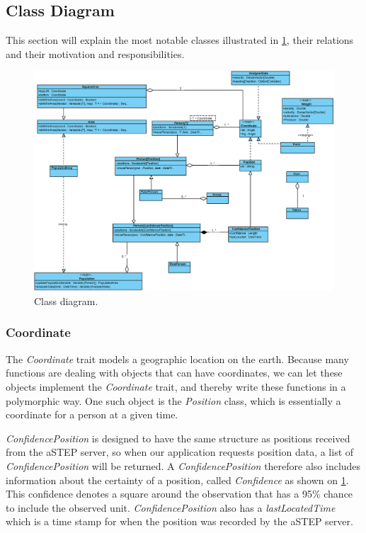 \subsection{Class Diagram}
This section will explain the most notable classes illustrated in \cref{fig:class}, their relations and their motivation and responsibilities.

\begin{figure}
\centering
\includegraphics[width=\linewidth]{figures/class.eps}
\caption{Class diagram.}
\label{fig:class}
\end{figure}

\subsubsection{Coordinate}
The \emph{Coordinate} trait models a geographic location on the earth. Because many functions are dealing with objects that can have coordinates, we can let these objects implement the \emph{Coordinate} trait, and thereby write these functions in a polymorphic way. One such object is the \emph{Position} class, which is essentially a coordinate for a person at a given time.

\emph{ConfidencePosition} is designed to have the same structure as positions received from the aSTEP server, so when our application requests position data, a list of \emph{ConfidencePosition} will be returned. A \emph{ConfidencePosition} therefore also includes information about the certainty of a position, called \emph{Confidence} as shown on \cref{fig:class}. This confidence denotes a square around the observation that has a 95\% chance to include the observed unit\cite{cisco}. \emph{ConfidencePosition} also has a \emph{lastLocatedTime} which is a time stamp for when the position was recorded by the aSTEP server.

